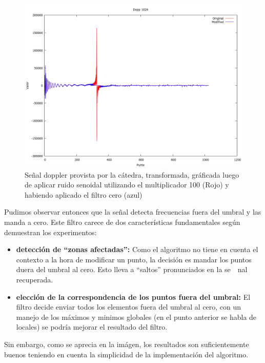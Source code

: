 \begin{figure}
\begin {center}
\includegraphics[width=360pt]{../matlab/dopp1024-sin100-zero-spec.png}
\end {center}
\caption{Se\~nal doppler provista por la c\'atedra, transformada, gr\'aficada
luego de aplicar ruido senoidal utilizando el multiplicador 100 (Rojo) y 
habiendo aplicado el filtro cero (azul)}
\label{fig:SinProm}
\end{figure}

Pudimos observar entonces que la se\~nal detecta frecuencias fuera del umbral y
las manda a cero. Este filtro carece de dos caracter\'isticas fundamentales
seg\'un demuestran los experimentos:

\begin{itemize}
	\item {\bf detecci\'on de ``zonas afectadas'':} Como el algoritmo no tiene en
cuenta el contexto a la hora de modificar un punto, la decisi\'on es mandar los
puntos duera del umbral al cero. Esto lleva a ``saltos'' pronunciados en la se\
~nal recuperada.

	\item {\bf elecci\'on de la correspondencia de los puntos fuera del umbral:}
El filtro decide enviar todos los elementos fuera del umbral al cero, con un
manejo de los m\'aximos y minimos globales (en el punto anterior se habla de
locales) se podr\'ia mejorar el resultado del filtro.
\end{itemize}

Sin embargo, como se aprecia en la im\'agen, los resultados son suficientemente
buenos teniendo en cuenta la simplicidad de la implementaci\'on del algoritmo.

